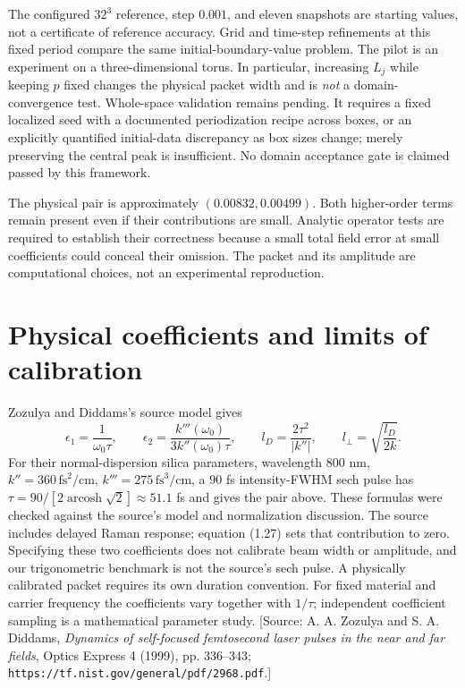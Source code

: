 \documentclass[11pt]{article}
\begin{document}
The configured $32^3$ reference, step $0.001$, and eleven snapshots are starting values, not a certificate of reference accuracy. Grid and time-step refinements at this fixed period compare the same initial-boundary-value problem. The pilot is an experiment on a three-dimensional torus. In particular, increasing $L_j$ while keeping $p$ fixed changes the physical packet width and is \emph{not} a domain-convergence test. Whole-space validation remains pending. It requires a fixed localized seed with a documented periodization recipe across boxes, or an explicitly quantified initial-data discrepancy as box sizes change; merely preserving the central peak is insufficient. No domain acceptance gate is claimed passed by this framework.

The physical pair is approximately $(0.00832,0.00499)$. Both higher-order terms remain present even if their contributions are small. Analytic operator tests are required to establish their correctness because a small total field error at small coefficients could conceal their omission. The packet and its amplitude are computational choices, not an experimental reproduction.

\section{Physical coefficients and limits of calibration}
Zozulya and Diddams's source model gives
\begin{equation}
\epsilon_1=\frac{1}{\omega_0\tau},\qquad
\epsilon_2=\frac{k'''(\omega_0)}{3k''(\omega_0)\tau},\qquad
l_D=\frac{2\tau^2}{|k''|},\qquad l_\perp=\sqrt{\frac{l_D}{2k}}.
\end{equation}
For their normal-dispersion silica parameters, wavelength $800$ nm, $k''=360\,\mathrm{fs}^2/\mathrm{cm}$, $k'''=275\,\mathrm{fs}^3/\mathrm{cm}$, a $90$ fs intensity-FWHM sech pulse has $\tau=90/[2\operatorname{arcosh}\sqrt2]\approx51.1$ fs and gives the pair above. These formulas were checked against the source's model and normalization discussion. The source includes delayed Raman response; equation (1.27) sets that contribution to zero. Specifying these two coefficients does not calibrate beam width or amplitude, and our trigonometric benchmark is not the source's sech pulse. A physically calibrated packet requires its own duration convention. For fixed material and carrier frequency the coefficients vary together with $1/\tau$; independent coefficient sampling is a mathematical parameter study. [Source: A. A. Zozulya and S. A. Diddams, \emph{Dynamics of self-focused femtosecond laser pulses in the near and far fields}, Optics Express 4 (1999), pp. 336--343; \texttt{https://tf.nist.gov/general/pdf/2968.pdf}.]
\end{document}

